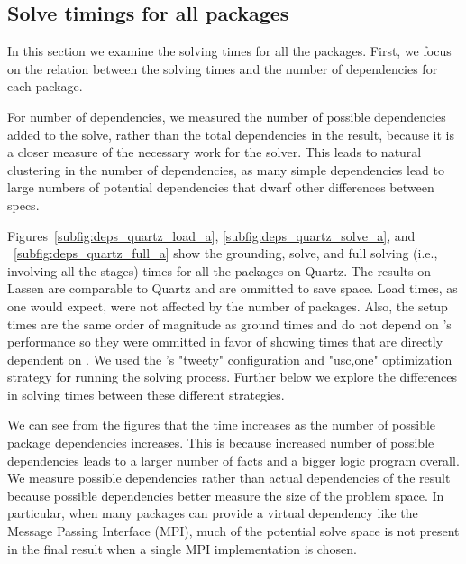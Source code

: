 \subsection{Solve timings for all packages}

In this section we examine the solving times for all the packages. First, we focus on the relation between the solving times and the number of dependencies for each package.

For number of dependencies, we measured the number of possible
dependencies added to the solve, rather than the total dependencies in
the result, because it is a closer measure of the necessary work for
the solver. This leads to natural clustering in the number of
dependencies, as many simple dependencies lead to large numbers of
potential dependencies that dwarf other differences between specs.

Figures~\ref{subfig:deps_quartz_load_a}, \ref{subfig:deps_quartz_solve_a}, and ~\ref{subfig:deps_quartz_full_a} show the grounding, solve, and full solving (i.e., involving all the stages) times for all the packages on Quartz. The results on Lassen are comparable to Quartz and are ommitted to save space. Load times, as one would expect, were not affected by the number of packages. Also, the setup times are the same order of magnitude as ground times and do not depend on \clingo{}'s performance so they were ommitted in favor of showing times that are directly dependent on \clingo{}. We used the \clingo{}'s "tweety" configuration and "usc,one" optimization strategy for running the solving process. Further below we explore the differences in solving times between these different strategies.

We can see from the figures that the time increases as the number of possible package dependencies increases. This is because increased number of possible dependencies leads to a larger number of facts and a bigger logic program overall. We measure possible dependencies rather than actual dependencies of the result because possible dependencies better measure the size of the problem space. In particular, when many packages can provide a virtual dependency like the Message Passing Interface (MPI), much of the potential solve space is not present in the final result when a single MPI implementation is chosen.

